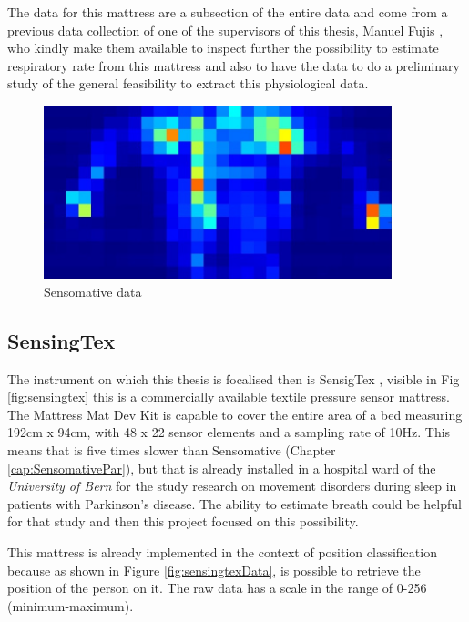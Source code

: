 The data for this mattress are a subsection of the entire data and come from a previous data collection of one of the supervisors of this thesis, Manuel Fujis \cite{ManuelZurich}, who kindly make them available to inspect further the possibility to estimate respiratory rate from this mattress and also to have the data to do a preliminary study of the general feasibility to extract this physiological data. 



\begin{figure}[H]
    \centering
    \includegraphics[width=0.9\textwidth]{img/sensomative_2.jpg}
    \caption{Sensomative data}
    \label{fig:sensomativeData}
\end{figure}
\vspace*{0.5cm}

\subsection{SensingTex} \label{cap:SensigTexPar}
The instrument on which this thesis is focalised then is SensigTex \cite{SensingConnectivity}, visible in Fig \ref{fig:sensingtex} this is a commercially available textile pressure sensor mattress. 
The Mattress Mat Dev Kit is capable to cover the entire area of a bed measuring 192cm x 94cm, with 48 x 22 sensor elements and a sampling rate of 10Hz. This means that is five times slower than Sensomative (Chapter \ref{cap:SensomativePar}), but that is already installed in a hospital ward of the \textit{University of Bern} for the study research on movement disorders during sleep in patients with Parkinson's disease. The ability to estimate breath could be helpful for that study and then this project focused on this possibility.

This mattress is already implemented in the context of position classification because as shown in Figure \ref{fig:sensingtexData}, is possible to retrieve the position of the person on it. The raw data has a scale in the range of 0-256 (minimum-maximum). 

